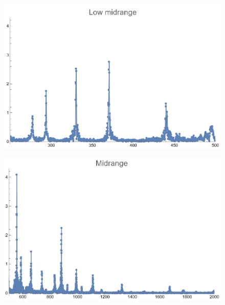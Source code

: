 \documentclass[12pt, letterpaper]{article}
\begin{document}
\begin{figure}[H]
  \centering
  \begin{minipage}{.5\textwidth}
    \centering
    \includegraphics[width=.9\linewidth]{imgs/Cancion1/lowmid.png}
    \label{fig:01d}
  \end{minipage}%
  \begin{minipage}{.5\textwidth}
    \centering
    \includegraphics[width=.9\linewidth]{imgs/Cancion1/mid.png}
    \label{fig:01e}
  \end{minipage}
\end{figure}
\end{document}
